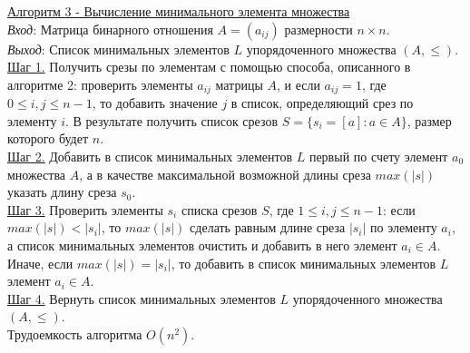 \documentclass[bachelor, och, labwork]{shiza}
\begin{document}
        \underline{Алгоритм 3 - Вычисление минимального элемента множества}\\
            \textit{Вход}: Матрица бинарного отношения $A = (a_{ij})$ размерности $n \times n$.\\
            \textit{Выход}: Список минимальных элементов $L$ упорядоченного множества $(A, \leq)$.\\
            \underline{Шаг 1.} Получить срезы по элементам с помощью способа, описанного в алгоритме 2: проверить
            элементы $a_{ij}$ матрицы $A$, и если $a_{ij} = 1$, где $0 \leq i, j \leq n - 1$, то добавить значение $j$ в
            список, определяющий срез по элементу $i$. В результате получить список срезов $S = \{s_i = [a]: a \in A\}$,
            размер которого будет $n$. \\
            \underline{Шаг 2.} Добавить в список минимальных элементов $L$ первый по счету элемент $a_0$ множества $A$,
            а в качестве максимальной возможной длины среза $max(|s|)$ указать длину среза $s_0$.\\
            \underline{Шаг 3.} Проверить элементы $s_i$ списка срезов $S$, где $1 \leq i, j \leq n - 1$: если $max(|s|)
            < |s_i|$, то $max(|s|)$ сделать равным длине среза $|s_i|$ по элементу $a_i$, а список минимальных элементов
            очистить и добавить в него элемент $a_i \in A$. Иначе, если $max(|s|) = |s_i|$, то добавить в список
            минимальных элементов $L$ элемент $a_i \in A$. \\
            \underline{Шаг 4.} Вернуть список минимальных элементов $L$ упорядоченного множества $(A, \leq)$.\\

            Трудоемкость алгоритма $O(n^2)$.\\
\end{document}

